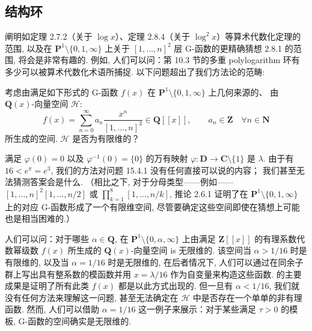 \subsection{结构环}\label{sec:15.4}

阐明如定理 2.7.2（关于 \(\log x\)）、定理 2.8.4（关于 \(\log^2 x\)）等算术代数化定理的范围, 
以及在 \(\mathbf{P}^1 \setminus \{0,1,\infty\}\) 上关于 \([1, \ldots, n]^2\) 
层 G-函数的更精确猜想 2.8.1 的范围, 
将会是非常有趣的. 
例如, 人们可以问：第 10.3 节的多重 polylogarithm 环有多少可以被算术代数化术语所捕捉. 
以下问题超出了我们方法论的范畴:

\begin{question}\label{qu:15.4.1}
考虑由满足如下形式的 G-函数 \(f(x)\) 
在 \(\mathbf{P}^1 \setminus \{0, 1, \infty\}\) 上几何来源的、
由 \(\mathbf{Q}(x)\)-向量空间 \(\mathcal{H}\):
\begin{equation}\label{eq:15.4.2}
f(x) = \sum_{n=0}^{\infty} a_n \frac{x^n}{[1, \dots, n]^3} \in \mathbf{Q}[\![x]\!], \qquad a_n \in \mathbf{Z} \quad \forall n \in \mathbf{N}
\end{equation}
所生成的空间. \(\mathcal{H}\) 是否为有限维的？
\end{question}

满足 \(\varphi(0)=0\) 以及 \(\varphi^{-1}(0)=\{0\}\) 的万有映射 \(\varphi: \mathbf{D} \to \mathbf{C} \setminus \{1\}\) 是 \(\lambda\). 
由于有 \(16 < e^\pi = e^3\), 
我们的方法对问题 15.4.1 没有任何直接可以说的内容； 
我们甚至无法猜测答案会是什么. 
（相比之下, 对于分母类型——例如——\([1, \ldots, n]^2[1, \dots, n/2]\) 
或 \(\prod_{k=1}^8 [1, \dots, n/k]\), 
推论 2.6.1 证明了在 \(\mathbf{P}^1 \setminus \{0, 1, \infty\}\) 上的对应 G-函数形成了一个有限维空间, 
尽管要确定这些空间即使在猜想上可能也是相当困难的.）

人们可以问：对于哪些 \(\alpha \in \mathbf{Q}\), 
在 \(\mathbf{P}^1 \setminus \{0, \alpha, \infty\}\) 
上由满足 \(\mathbf{Z}[\![x]\!]\) 
的有理系数代数幂级数 \(f(x)\) 所生成的 \(\mathbf{Q}(x)\)-向量空间 is 无限维的. 
该空间当 \(\alpha > 1/16\) 时是有限维的, 
以及当 \(\alpha = 1/16\) 时是无限维的, 
在后者情况下, 人们可以通过在同余子群上写出具有整系数的模函数并用 \(x = \lambda/16\) 
作为自变量来构造这些函数. 
\cite{CDT21} 的主要成果是证明了所有此类 \(f(x)\) 都是以此方式出现的. 
但一旦有 \(\alpha < 1/16\), 我们就没有任何方法来理解这一问题, 
甚至无法确定在 \(\mathcal{H}\) 中是否存在一个单单的非有理函数. 
然而, 人们可以借助 \(\alpha = 1/16\) 这一例子来展示：对于某些满足 \(\tau > 0\) 
的模板, G-函数的空间确实是无限维的.

